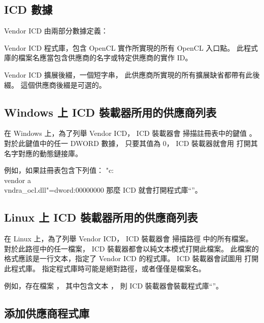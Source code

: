 \subsection{ICD 數據}

Vendor ICD 由兩部分數據定義：
\startigBase
\item Vendor ICD 程式庫，包含 OpenCL 實作所實現的所有 OpenCL 入口點。
此程式庫的檔案名應當包含供應商的名字或特定供應商的實作 ID。

\item Vendor ICD 擴展後綴，一個短字串，
此供應商所實現的所有擴展缺省都帶有此後綴。
這個供應商後綴是可選的。
\stopigBase

\subsection{Windows 上 ICD 裝載器所用的供應商列表}

在 Windows 上，為了列舉 Vendor ICD， ICD 裝載器會
掃描註冊表中的鍵值 。
對於此鍵值中的任一 DWORD 數據，
只要其值為 0， ICD 裝載器就會用  打開其名字對應的動態鏈接庫。

例如，如果註冊表包含下列值：
"c:\\vendor a\\vndra_ocl.dll"=dword:00000000
\stopclc
那麼 ICD 就會打開程式庫“”。


\subsection{Linux 上 ICD 裝載器所用的供應商列表}

在 Linux 上，為了列舉 Vendor ICD， ICD 裝載器會
掃描路徑  中的所有檔案。
對於此路徑中的任一檔案， ICD 裝載器都會以純文本模式打開此檔案。
此檔案的格式應該是一行文本，指定了 Vendor ICD 的程式庫。
 ICD 裝載器會試圖用  打開此程式庫。
指定程式庫時可能是絕對路徑，或者僅僅是檔案名。

例如，存在檔案 ，
其中包含文本 ，
則 ICD 裝載器會裝載程式庫“”。

\subsection{添加供應商程式庫}

